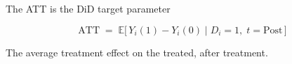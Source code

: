 \documentclass[aspectratio=169,11pt]{beamer}
\begin{document}
\begin{frame}{The ATT is the DiD target parameter}
\vspace{1.5em}
\begin{center}
\Large
\[
\text{ATT} \;=\; \mathbb{E}\big[\, Y_i(1) - Y_i(0) \;\big|\; D_i = 1,\; t = \text{Post}\,\big]
\]
\end{center}
\vspace{1em}
\begin{center}
\color{charcoal}The average treatment effect on the treated, after treatment.
\end{center}
\vspace{0.6em}
\end{frame}
\end{document}
